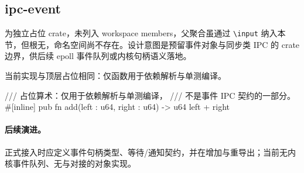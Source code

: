 
\subsection{ipc-event}

为独立占位 crate，未列入 workspace members，父聚合虽通过 \texttt{\textbackslash input} 纳入本节，但根无，命名空间尚不存在。设计意图是预留事件对象与同步类 IPC 的 crate 边界，供后续 epoll 事件队列或内核句柄语义落地。

当前实现与顶层占位相同：仅函数用于依赖解析与单测编译。

\begin{rustcode}
/// 占位算术：仅用于依赖解析与单测编译，
/// 不是事件 IPC 契约的一部分。
#[inline]
pub fn add(left : u64, right : u64) -> u64 { left + right }
\end{rustcode}

\paragraph{后续演进。}
正式接入时应定义事件句柄类型、等待/通知契约，并在增加与重导出；当前无内核事件队列、无与对接的对象实现。

